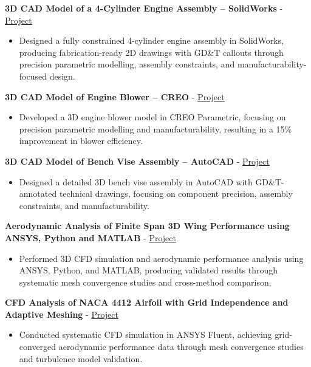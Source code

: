 \documentclass[10pt, letterpaper]{article}
\newcommand{\projheadlink}[3]{\vspace{5pt}\textbf{#1} - \href{#3}{\textcolor{linkblue}{\underline{#2}}}\par\vspace{1pt}}
\begin{document}
\projheadlink{3D CAD Model of a 4-Cylinder Engine Assembly -- SolidWorks}{Project}{https://www.linkedin.com/posts/jaykumar-prajapati_solidworks-engineeringdesign-mechanicalengineering-activity-7302416331335733250-yL2l}
\begin{itemize}
  \item Designed a fully constrained 4-cylinder engine assembly in SolidWorks, producing fabrication-ready 2D drawings with GD\&T callouts through precision parametric modelling, assembly constraints, and manufacturability-focused design.
\end{itemize}

\projheadlink{3D CAD Model of Engine Blower -- CREO}{Project}{https://www.linkedin.com/posts/jaykumar-prajapati_creo-mechanicaldesign-engineblower-activity-7303508858855899136-XrA0}
\begin{itemize}
  \item Developed a 3D engine blower model in CREO Parametric, focusing on precision parametric modelling and manufacturability, resulting in a 15\% improvement in blower efficiency.
\end{itemize}

\projheadlink{3D CAD Model of Bench Vise Assembly -- AutoCAD}{Project}{https://www.linkedin.com/posts/jaykumar-prajapati_autocad-3dmodeling-mechanicalengineering-activity-7296754704766681088-dPDm}
\begin{itemize}
  \item Designed a detailed 3D bench vise assembly in AutoCAD with GD\&T-annotated technical drawings, focusing on component precision, assembly constraints, and manufacturability.
\end{itemize}

\projheadlink{Aerodynamic Analysis of Finite Span 3D Wing Performance using ANSYS, Python and MATLAB}{Project}{https://www.linkedin.com/posts/jaykumar-prajapati_aerodynamics-cfd-finitespanwing-activity-7300952489443434497-08Zf}
\begin{itemize}
  \item Performed 3D CFD simulation and aerodynamic performance analysis using ANSYS, Python, and MATLAB, producing validated results through systematic mesh convergence studies and cross-method comparison.
\end{itemize}

\projheadlink{CFD Analysis of NACA 4412 Airfoil with Grid Independence and Adaptive Meshing}{Project}{https://www.linkedin.com/posts/jaykumar-prajapati_cfd-aerodynamics-engineering-activity-7301811668550856706-MpND}
\begin{itemize}
  \item Conducted systematic CFD simulation in ANSYS Fluent, achieving grid-converged aerodynamic performance data through mesh convergence studies and turbulence model validation.
\end{itemize}
\end{document}
